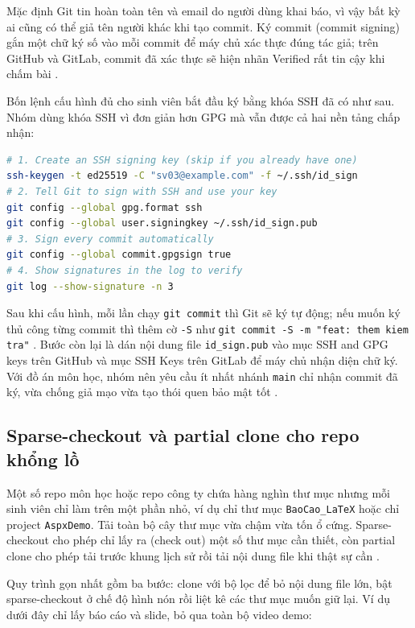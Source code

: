 Mặc định Git tin hoàn toàn tên và email do người dùng khai báo, vì vậy bất kỳ ai cũng có thể giả tên người khác khi tạo commit. Ký commit (commit signing) gắn một chữ ký số vào mỗi commit để máy chủ xác thực đúng tác giả; trên GitHub và GitLab, commit đã xác thực sẽ hiện nhãn Verified rất tin cậy khi chấm bài \cite{githubdocs,gitlabdocs}.

Bốn lệnh cấu hình đủ cho sinh viên bắt đầu ký bằng khóa SSH đã có như sau. Nhóm dùng khóa SSH vì đơn giản hơn GPG mà vẫn được cả hai nền tảng chấp nhận:

\begin{lstlisting}[language=bash, caption={Cau hinh ky commit bang khoa SSH}, label={lst:c33-sign}]
# 1. Create an SSH signing key (skip if you already have one)
ssh-keygen -t ed25519 -C "sv03@example.com" -f ~/.ssh/id_sign
# 2. Tell Git to sign with SSH and use your key
git config --global gpg.format ssh
git config --global user.signingkey ~/.ssh/id_sign.pub
# 3. Sign every commit automatically
git config --global commit.gpgsign true
# 4. Show signatures in the log to verify
git log --show-signature -n 3
\end{lstlisting}

Sau khi cấu hình, mỗi lần chạy \verb|git commit| thì Git sẽ ký tự động; nếu muốn ký thủ công từng commit thì thêm cờ \verb|-S| như \verb|git commit -S -m "feat: them kiem tra"| . Bước còn lại là dán nội dung file \verb|id_sign.pub| vào mục SSH and GPG keys trên GitHub và mục SSH Keys trên GitLab để máy chủ nhận diện chữ ký. Với đồ án môn học, nhóm nên yêu cầu ít nhất nhánh \verb|main| chỉ nhận commit đã ký, vừa chống giả mạo vừa tạo thói quen bảo mật tốt \cite{progit}.

\subsection{Sparse-checkout và partial clone cho repo khổng lồ}

Một số repo môn học hoặc repo công ty chứa hàng nghìn thư mục nhưng mỗi sinh viên chỉ làm trên một phần nhỏ, ví dụ chỉ thư mục \verb|BaoCao_LaTeX| hoặc chỉ project \verb|AspxDemo|. Tải toàn bộ cây thư mục vừa chậm vừa tốn ổ cứng. Sparse-checkout cho phép chỉ lấy ra (check out) một số thư mục cần thiết, còn partial clone cho phép tải trước khung lịch sử rồi tải nội dung file khi thật sự cần \cite{progit}.

Quy trình gọn nhất gồm ba bước: clone với bộ lọc để bỏ nội dung file lớn, bật sparse-checkout ở chế độ hình nón rồi liệt kê các thư mục muốn giữ lại. Ví dụ dưới đây chỉ lấy báo cáo và slide, bỏ qua toàn bộ video demo:

